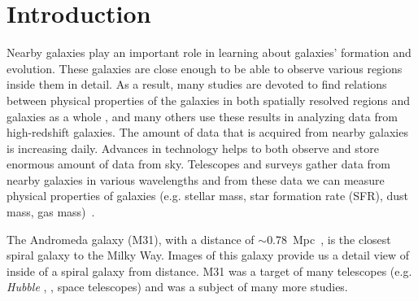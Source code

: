 \section{Introduction} %


Nearby galaxies play an important role in learning about galaxies' formation and evolution.
These galaxies are close enough to be able to observe various regions inside them in detail.
As a result, many studies are devoted to find relations between physical properties of the galaxies in both spatially resolved regions and galaxies as a whole%
, and many others use these results in analyzing data from high-redshift galaxies. %
The amount of data that is acquired from nearby galaxies is increasing daily.
Advances in technology helps to both observe and store enormous amount of data from sky.%
Telescopes and surveys gather data from nearby galaxies in various wavelengths and from these data we can measure physical properties of galaxies (e.g. stellar mass, star formation rate (SFR), dust mass, gas mass)~\citep[e.g.][]{Calzetti07,Dale09,Eskew12}.

The Andromeda galaxy (M31), with a distance of $\sim$0.78~Mpc~\citep{McConnachie05}, is the closest spiral galaxy to the Milky Way.
Images of this galaxy provide us a detail view of inside of a spiral galaxy from distance.
M31 was a target of many telescopes (e.g. {\it Hubble} \citep{Dalcanton12}, \Spitzer\citep{Wener04}, \Herschel\citep{Pilbratt10} space telescopes) and was a subject of many more studies. %

